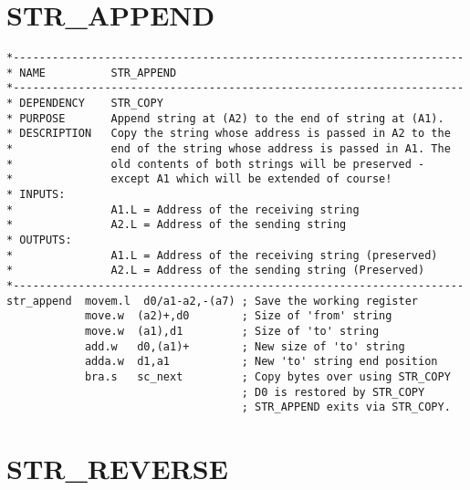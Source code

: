 \section{STR\_APPEND}
\label{ch9-STR_APPEND}%

\begin{lstlisting}[firstnumber=1,caption={STR\_APPEND}]
*---------------------------------------------------------------------
* NAME          STR_APPEND
*---------------------------------------------------------------------
* DEPENDENCY    STR_COPY
* PURPOSE       Append string at (A2) to the end of string at (A1).
* DESCRIPTION   Copy the string whose address is passed in A2 to the
*               end of the string whose address is passed in A1. The 
*               old contents of both strings will be preserved - 
*               except A1 which will be extended of course!
* INPUTS:
*               A1.L = Address of the receiving string
*               A2.L = Address of the sending string
* OUTPUTS:
*               A1.L = Address of the receiving string (preserved)
*               A2.L = Address of the sending string (Preserved)
*---------------------------------------------------------------------
str_append  movem.l  d0/a1-a2,-(a7) ; Save the working register
            move.w  (a2)+,d0        ; Size of 'from' string
            move.w  (a1),d1         ; Size of 'to' string
            add.w   d0,(a1)+        ; New size of 'to' string
            adda.w  d1,a1           ; New 'to' string end position
            bra.s   sc_next         ; Copy bytes over using STR_COPY
                                    ; D0 is restored by STR_COPY
                                    ; STR_APPEND exits via STR_COPY.
\end{lstlisting}

\section{STR\_REVERSE}
\label{ch9-STR_REVERSE}%

